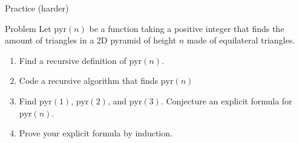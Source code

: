 \documentclass[dvipsnames,t]{beamer}
\begin{document}
\begin{frame}{Practice (harder)}
\begin{block}{Problem}
Let $\text{pyr}(n)$ be a function taking a positive integer that finds the amount of triangles in a 2D pyramid of height $n$ made of equilateral triangles.
\begin{enumerate}
    \item Find a recursive definition of $\text{pyr}(n)$.
    \item Code a recursive algorithm  that finds $\text{pyr}(n)$
    \item Find $\text{pyr}(1)$, $\text{pyr}(2)$, and $\text{pyr}(3)$. Conjecture an explicit formula for $\text{pyr}(n)$.
    \item Prove your explicit formula by induction.

\end{enumerate}
\end{block}
\end{frame}
\end{document}
